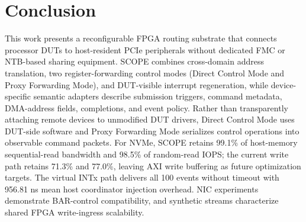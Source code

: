 \documentclass[10pt,conference,letterpaper]{IEEEtran}
\begin{document}

\section{Conclusion}
This work presents a reconfigurable FPGA routing substrate that connects processor DUTs to host-resident PCIe peripherals without dedicated FMC or NTB-based sharing equipment. SCOPE combines cross-domain address translation, two register-forwarding control modes (Direct Control Mode and Proxy Forwarding Mode), and DUT-visible interrupt regeneration, while device-specific semantic adapters describe submission triggers, command metadata, DMA-address fields, completions, and event policy. Rather than transparently attaching remote devices to unmodified DUT drivers, Direct Control Mode uses DUT-side software and Proxy Forwarding Mode serializes control operations into observable command packets. For NVMe, SCOPE retains 99.1\% of host-memory sequential-read bandwidth and 98.5\% of random-read IOPS; the current write path retains 71.3\% and 77.0\%, leaving AXI write buffering as future optimization targets. The virtual INTx path delivers all 100 events without timeout with 956.81 ns mean host coordinator injection overhead. NIC experiments demonstrate BAR-control compatibility, and synthetic streams characterize shared FPGA write-ingress scalability.


\newpage





\end{document}
